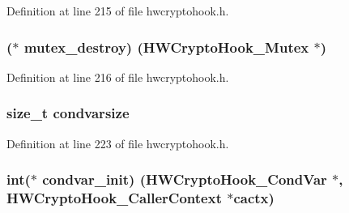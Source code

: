 Definition at line 215 of file hwcryptohook.\+h.

\subsubsection[{\texorpdfstring{mutex\+\_\+destroy}{mutex_destroy}}]{($\ast$ mutex\+\_\+destroy) ({\bf H\+W\+Crypto\+Hook\+\_\+\+Mutex} $\ast$)}\hypertarget{struct_h_w_crypto_hook___init_info_a1fa087e6efac70cfe6533e329e236231}{}\label{struct_h_w_crypto_hook___init_info_a1fa087e6efac70cfe6533e329e236231}


Definition at line 216 of file hwcryptohook.\+h.

\subsubsection[{\texorpdfstring{condvarsize}{condvarsize}}]{\setlength{\rightskip}{0pt plus 5cm}size\+\_\+t condvarsize}\hypertarget{struct_h_w_crypto_hook___init_info_aec421ccbd2f9b08d5675cf6fd5b911ae}{}\label{struct_h_w_crypto_hook___init_info_aec421ccbd2f9b08d5675cf6fd5b911ae}


Definition at line 223 of file hwcryptohook.\+h.

\subsubsection[{\texorpdfstring{condvar\+\_\+init}{condvar_init}}]{\setlength{\rightskip}{0pt plus 5cm}int($\ast$ condvar\+\_\+init) ({\bf H\+W\+Crypto\+Hook\+\_\+\+Cond\+Var} $\ast$, {\bf H\+W\+Crypto\+Hook\+\_\+\+Caller\+Context} $\ast$cactx)}\hypertarget{struct_h_w_crypto_hook___init_info_a3fa1c5683fbfdca8a3e8e9d42933cf65}{}\label{struct_h_w_crypto_hook___init_info_a3fa1c5683fbfdca8a3e8e9d42933cf65}


